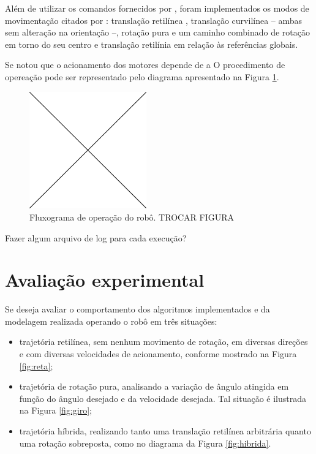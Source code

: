 Além de utilizar os comandos fornecidos por \citet{ritter2016modelagem}, foram implementados os modos de movimentação citados por \citet{loh2003mechatronics}: translação retilínea , translação curvilínea -- ambas sem alteração na orientação --, rotação pura e um caminho combinado de rotação em torno do seu centro e translação retilínia em relação às referências globais.

Se notou que o acionamento dos motores depende de a
O procedimento de opereação pode ser representado pelo diagrama apresentado na Figura \ref{fig:operation}.

\begin{figure}[h]
  \centering
  \includegraphics[width = 0.45\textwidth]{imagens/edc}
  \caption{Fluxograma de operação do robô. TROCAR FIGURA}
  \label{fig:operation}
\end{figure}

Fazer algum arquivo de log para cada execução?

\section{Avaliação experimental}
\label{sec:experimental}

Se deseja avaliar o comportamento dos algoritmos implementados e da modelagem realizada operando o robô em três situações:
\begin{itemize}
  \item{trajetória retilínea, sem nenhum movimento de rotação, em diversas direções e com diversas velocidades de acionamento, conforme mostrado na Figura \ref{fig:reta};}
  \item{trajetória de rotação pura, analisando a variação de ângulo atingida em função do ângulo desejado e da velocidade desejada. Tal situação é ilustrada na Figura \ref{fig:giro};}
  \item{trajetória híbrida, realizando tanto uma translação retilínea arbitrária quanto uma rotação sobreposta, como no diagrama da Figura \ref{fig:hibrida}.}
\end{itemize}

